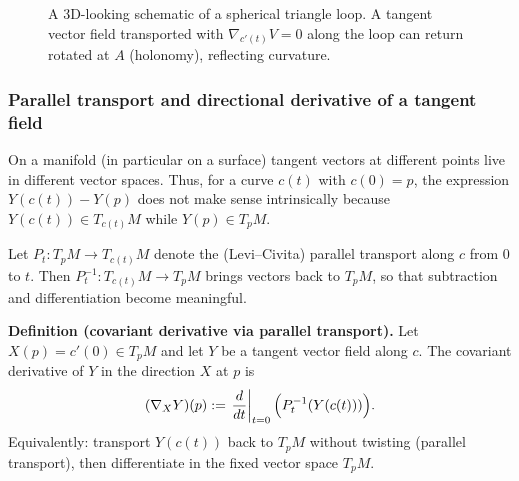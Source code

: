 \documentclass[12pt,a4paper]{article}
\theoremstyle{plain}
\theoremstyle{definition}      %
\begin{document}
\begin{figure}[H]
		
		\caption{A 3D-looking schematic of a spherical triangle loop. A tangent vector field transported with
			$\nabla_{c'(t)}V=0$ along the loop can return rotated at $A$ (holonomy), reflecting curvature.}
	\end{figure}


\subsubsection*{Parallel transport and directional derivative of a tangent field}

On a manifold (in particular on a surface) tangent vectors at different points live in
different vector spaces. Thus, for a curve $c(t)$ with $c(0)=p$,
the expression $Y(c(t)) - Y(p)$ does not make sense intrinsically because
$Y(c(t))\in T_{c(t)}M$ while $Y(p)\in T_pM$.

\medskip
Let $P_t:T_pM\to T_{c(t)}M$ denote the (Levi--Civita) parallel transport along $c$
from $0$ to $t$. Then $P_t^{-1}:T_{c(t)}M\to T_pM$ brings vectors back to $T_pM$,
so that subtraction and differentiation become meaningful.

\medskip
\textbf{Definition (covariant derivative via parallel transport).}
Let $X(p)=c'(0)\in T_pM$ and let $Y$ be a tangent vector field along $c$.
The covariant derivative of $Y$ in the direction $X$ at $p$ is
\[
(\nabla_X Y)(p)
:=\left.\frac{d}{dt}\right|_{t=0}\Bigl(P_t^{-1}(Y(c(t)))\Bigr).
\]
Equivalently: transport $Y(c(t))$ back to $T_pM$ without twisting (parallel transport),
then differentiate in the fixed vector space $T_pM$.
\end{document}
